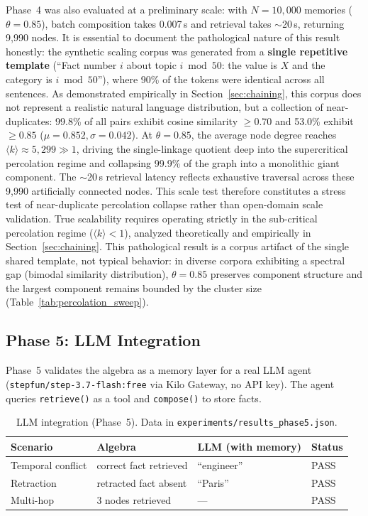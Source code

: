 \documentclass[11pt,a4paper]{article}
\theoremstyle{definition}
\begin{document}
Phase~4 was also evaluated at a preliminary scale: with $N = 10{,}000$ memories ($\theta = 0.85$), batch composition takes 0.007\,s and retrieval takes $\sim$20\,s, returning 9{,}990 nodes. It is essential to document the pathological nature of this result honestly: the synthetic scaling corpus was generated from a \textbf{single repetitive template} (``Fact number $i$ about topic $i \bmod 50$: the value is $X$ and the category is $i \bmod 50$''), where 90\% of the tokens were identical across all sentences. As demonstrated empirically in Section~\ref{sec:chaining}, this corpus does not represent a realistic natural language distribution, but a collection of near-duplicates: 99.8\% of all pairs exhibit cosine similarity $\ge 0.70$ and 53.0\% exhibit $\ge 0.85$ ($\mu = 0.852, \sigma = 0.042$). At $\theta = 0.85$, the average node degree reaches $\langle k \rangle \approx 5{,}299 \gg 1$, driving the single-linkage quotient deep into the supercritical percolation regime and collapsing 99.9\% of the graph into a monolithic giant component. The $\sim$20\,s retrieval latency reflects exhaustive traversal across these 9,990 artificially connected nodes. This scale test therefore constitutes a stress test of near-duplicate percolation collapse rather than open-domain scale validation. True scalability requires operating strictly in the sub-critical percolation regime ($\langle k \rangle < 1$), analyzed theoretically and empirically in Section~\ref{sec:chaining}. This pathological result is a corpus artifact of the single shared template, not typical behavior: in diverse corpora exhibiting a spectral gap (bimodal similarity distribution), $\theta = 0.85$ preserves component structure and the largest component remains bounded by the cluster size (Table~\ref{tab:percolation_sweep}).

\subsection{Phase 5: LLM Integration}

Phase~5 validates the algebra as a memory layer for a real LLM agent (\texttt{stepfun/step-3.7-flash:free} via Kilo Gateway, no API key). The agent queries \texttt{retrieve()} as a tool and \texttt{compose()} to store facts.

\begin{table}[h]
\centering
\begin{tabular}{llll}
\toprule
\textbf{Scenario} & \textbf{Algebra} & \textbf{LLM (with memory)} & \textbf{Status} \\
\midrule
Temporal conflict & correct fact retrieved & ``engineer'' & PASS \\
Retraction & retracted fact absent & ``Paris'' & PASS \\
Multi-hop & 3 nodes retrieved & --- & PASS \\
\bottomrule
\end{tabular}
\caption{LLM integration (Phase~5). Data in \texttt{experiments/results\_phase5.json}.}
\end{table}
\end{document}
